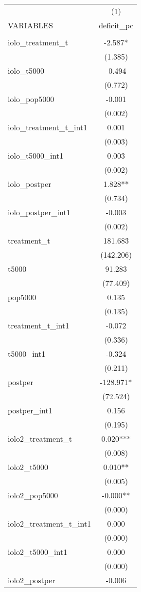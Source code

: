 \documentclass[]{article}
\begin{document}
\begin{tabular}{lc} \hline
 & (1) \\
VARIABLES & deficit\_pc \\ \hline
 &  \\
iolo\_treatment\_t & -2.587* \\
 & (1.385) \\
iolo\_t5000 & -0.494 \\
 & (0.772) \\
iolo\_pop5000 & -0.001 \\
 & (0.002) \\
iolo\_treatment\_t\_int1 & 0.001 \\
 & (0.003) \\
iolo\_t5000\_int1 & 0.003 \\
 & (0.002) \\
iolo\_postper & 1.828** \\
 & (0.734) \\
iolo\_postper\_int1 & -0.003 \\
 & (0.002) \\
treatment\_t & 181.683 \\
 & (142.206) \\
t5000 & 91.283 \\
 & (77.409) \\
pop5000 & 0.135 \\
 & (0.135) \\
treatment\_t\_int1 & -0.072 \\
 & (0.336) \\
t5000\_int1 & -0.324 \\
 & (0.211) \\
postper & -128.971* \\
 & (72.524) \\
postper\_int1 & 0.156 \\
 & (0.195) \\
iolo2\_treatment\_t & 0.020*** \\
 & (0.008) \\
iolo2\_t5000 & 0.010** \\
 & (0.005) \\
iolo2\_pop5000 & -0.000** \\
 & (0.000) \\
iolo2\_treatment\_t\_int1 & 0.000 \\
 & (0.000) \\
iolo2\_t5000\_int1 & 0.000 \\
 & (0.000) \\
iolo2\_postper & -0.006 \\

\end{tabular}
\end{document}
